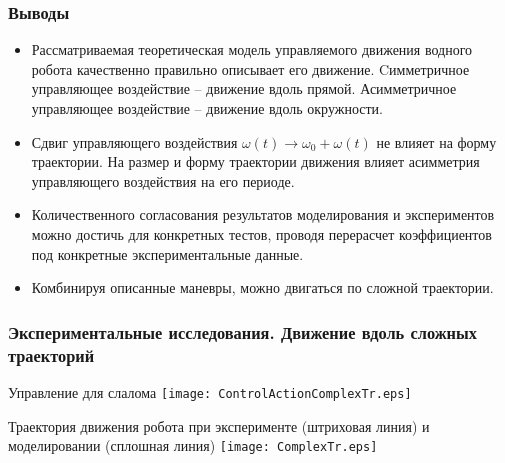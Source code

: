 \begin{frame}
\frametitle{Выводы}
\begin{itemize}
	\item Рассматриваемая теоретическая модель управляемого движения водного робота качественно правильно описывает его движение. Cимметричное управляющее воздействие -- движение вдоль прямой. Асимметричное управляющее воздействие -- движение вдоль окружности.
	
	\item Сдвиг управляющего воздействия $\omega(t) \rightarrow \omega_0 + \omega(t)$ не влияет на форму траектории. На размер и форму траектории движения влияет асимметрия управляющего воздействия на его периоде.
	
	\item Количественного согласования результатов моделирования и экспериментов можно достичь для конкретных тестов, проводя перерасчет коэффициентов под конкретные экспериментальные данные.
	
	\item Комбинируя описанные маневры, можно двигаться по сложной траектории.
	
\end{itemize}

\end{frame}


\begin{frame}
\frametitle{Экспериментальные исследования. Движение вдоль сложных траекторий}


	{Управление для слалома}
	\centering
	\texttt{[image: ControlActionComplexTr.eps]}

	{Траектория движения робота при эксперименте (штриховая линия) и моделировании (сплошная линия)}
	\centering
	\texttt{[image: ComplexTr.eps]}


\end{frame}

